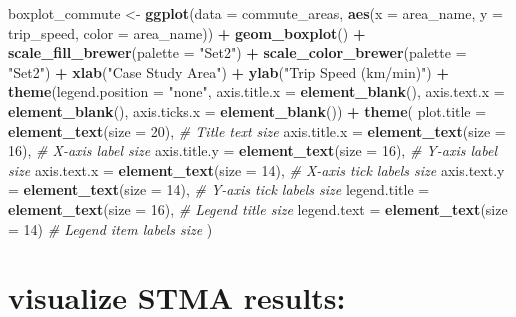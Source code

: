 \documentclass[
]{article}
\newenvironment{Shaded}{\begin{snugshade}}{\end{snugshade}}
\newcommand{\AttributeTok}[1]{\textcolor[rgb]{0.13,0.29,0.53}{#1}}
\newcommand{\CommentTok}[1]{\textcolor[rgb]{0.56,0.35,0.01}{\textit{#1}}}
\newcommand{\DecValTok}[1]{\textcolor[rgb]{0.00,0.00,0.81}{#1}}
\newcommand{\FunctionTok}[1]{\textcolor[rgb]{0.13,0.29,0.53}{\textbf{#1}}}
\newcommand{\NormalTok}[1]{#1}
\newcommand{\OtherTok}[1]{\textcolor[rgb]{0.56,0.35,0.01}{#1}}
\newcommand{\SpecialCharTok}[1]{\textcolor[rgb]{0.81,0.36,0.00}{\textbf{#1}}}
\newcommand{\StringTok}[1]{\textcolor[rgb]{0.31,0.60,0.02}{#1}}
\begin{document}
\begin{Shaded}
\begin{Highlighting}[]
\NormalTok{boxplot\_commute }\OtherTok{\textless{}{-}} \FunctionTok{ggplot}\NormalTok{(}\AttributeTok{data =}\NormalTok{ commute\_areas, }\FunctionTok{aes}\NormalTok{(}\AttributeTok{x =}\NormalTok{ area\_name, }\AttributeTok{y =}\NormalTok{ trip\_speed, }\AttributeTok{color =}\NormalTok{ area\_name)) }\SpecialCharTok{+} 
  \FunctionTok{geom\_boxplot}\NormalTok{() }\SpecialCharTok{+} 
  \FunctionTok{scale\_fill\_brewer}\NormalTok{(}\AttributeTok{palette =} \StringTok{"Set2"}\NormalTok{) }\SpecialCharTok{+} 
  \FunctionTok{scale\_color\_brewer}\NormalTok{(}\AttributeTok{palette =} \StringTok{"Set2"}\NormalTok{) }\SpecialCharTok{+} 
  \FunctionTok{xlab}\NormalTok{(}\StringTok{"Case Study Area"}\NormalTok{) }\SpecialCharTok{+} 
  \FunctionTok{ylab}\NormalTok{(}\StringTok{"Trip Speed (km/min)"}\NormalTok{) }\SpecialCharTok{+} 
  \FunctionTok{theme}\NormalTok{(}\AttributeTok{legend.position =} \StringTok{"none"}\NormalTok{, }\AttributeTok{axis.title.x =} \FunctionTok{element\_blank}\NormalTok{(), }\AttributeTok{axis.text.x =} \FunctionTok{element\_blank}\NormalTok{(), }\AttributeTok{axis.ticks.x =} \FunctionTok{element\_blank}\NormalTok{()) }\SpecialCharTok{+} 
  \FunctionTok{theme}\NormalTok{(}
  \AttributeTok{plot.title =} \FunctionTok{element\_text}\NormalTok{(}\AttributeTok{size =} \DecValTok{20}\NormalTok{),       }\CommentTok{\# Title text size}
  \AttributeTok{axis.title.x =} \FunctionTok{element\_text}\NormalTok{(}\AttributeTok{size =} \DecValTok{16}\NormalTok{),      }\CommentTok{\# X{-}axis label size}
  \AttributeTok{axis.title.y =} \FunctionTok{element\_text}\NormalTok{(}\AttributeTok{size =} \DecValTok{16}\NormalTok{),      }\CommentTok{\# Y{-}axis label size}
  \AttributeTok{axis.text.x =} \FunctionTok{element\_text}\NormalTok{(}\AttributeTok{size =} \DecValTok{14}\NormalTok{),       }\CommentTok{\# X{-}axis tick labels size}
  \AttributeTok{axis.text.y =} \FunctionTok{element\_text}\NormalTok{(}\AttributeTok{size =} \DecValTok{14}\NormalTok{),       }\CommentTok{\# Y{-}axis tick labels size}
  \AttributeTok{legend.title =} \FunctionTok{element\_text}\NormalTok{(}\AttributeTok{size =} \DecValTok{16}\NormalTok{),      }\CommentTok{\# Legend title size}
  \AttributeTok{legend.text =} \FunctionTok{element\_text}\NormalTok{(}\AttributeTok{size =} \DecValTok{14}\NormalTok{)        }\CommentTok{\# Legend item labels size}
\NormalTok{  )}
\end{Highlighting}
\end{Shaded}

\section{visualize STMA results:}\label{visualize-stma-results}
\end{document}
